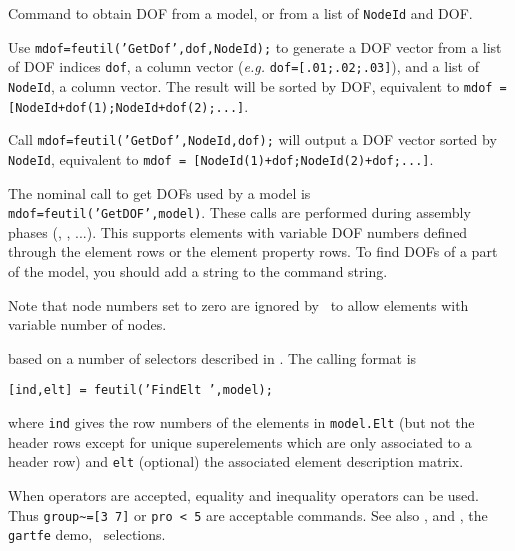 
Command to obtain DOF from a model, or from a list of {\tt NodeId} and DOF.

\vs

Use {\tt mdof=feutil('GetDof',dof,NodeId);} to generate a DOF vector from a list of DOF indices {\tt dof}, a column vector ({\it e.g.} {\tt dof=[.01;.02;.03]}), and a list of {\tt NodeId}, a column vector. The result will be sorted by DOF, equivalent to {\tt mdof = [NodeId+dof(1);NodeId+dof(2);...]}.

Call {\tt mdof=feutil('GetDof',NodeId,dof);} will output a DOF vector sorted by {\tt NodeId}, equivalent to {\tt mdof = [NodeId(1)+dof;NodeId(2)+dof;...]}.

\vs

The nominal call to get DOFs used by a model is {\tt mdof=feutil('GetDOF',model)}. These calls are performed during assembly phases (\femk, \feload, ...). This supports elements with variable DOF numbers defined through the element rows or the element property rows. 
To find DOFs of a part of the model, you should add a  string to the  command string.

Note that node numbers set to zero are ignored by \feutil\  to allow elements with variable number of nodes.



 based on a number of selectors described in . The calling format is 

{\tt [ind,elt] = feutil('FindElt ',model);} 

where {\tt ind} gives the row numbers of the elements in {\tt model.Elt} (but not the header rows except for unique superelements which are only associated to a header row) and {\tt elt} (optional) the associated element description matrix. 

When operators are accepted, equality and inequality operators can be used. Thus {\tt group\verb+~=+[3 7]} or {\tt pro < 5} are acceptable commands. See also ,  and , the {\tt gartfe} demo, \fecom\ selections.



